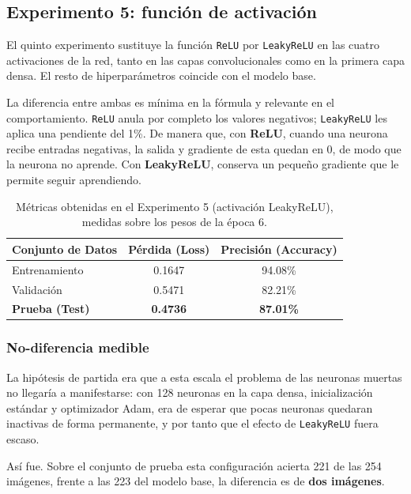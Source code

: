 \documentclass[11pt, a4paper]{article}
\begin{document}
\subsection{Experimento 5: función de activación}

El quinto experimento sustituye la función \texttt{ReLU} por \texttt{LeakyReLU} en las cuatro activaciones de la red, tanto en las capas convolucionales como en la primera capa densa. El resto de hiperparámetros coincide con el modelo base.

La diferencia entre ambas es mínima en la fórmula y relevante en el comportamiento. \texttt{ReLU} anula por completo los valores negativos; \texttt{LeakyReLU} les aplica una pendiente del 1\%. De manera que, con \textbf{ReLU}, cuando una neurona recibe entradas negativas, la salida y gradiente de esta quedan en 0, de modo que la neurona no aprende. Con \textbf{LeakyReLU}, conserva un pequeño gradiente que le permite seguir aprendiendo.

\begin{table}[H]
\centering
\caption{Métricas obtenidas en el Experimento 5 (activación LeakyReLU), medidas sobre los pesos de la época 6.}
\label{tab:resultados_exp5}
\begin{tabular}{l c c}
\toprule
\textbf{Conjunto de Datos} & \textbf{Pérdida (Loss)} & \textbf{Precisión (Accuracy)} \\
\midrule
Entrenamiento & 0.1647 & 94.08\% \\
Validación & 0.5471 & 82.21\% \\
\textbf{Prueba (Test)} & \textbf{0.4736} & \textbf{87.01\%} \\
\bottomrule
\end{tabular}
\end{table}

\subsubsection{No-diferencia medible}

La hipótesis de partida era que a esta escala el problema de las neuronas muertas no llegaría a manifestarse: con 128 neuronas en la capa densa, inicialización estándar y optimizador Adam, era de esperar que pocas neuronas quedaran inactivas de forma permanente, y por tanto que el efecto de \texttt{LeakyReLU} fuera escaso.

Así fue. Sobre el conjunto de prueba esta configuración acierta 221 de las 254 imágenes, frente a las 223 del modelo base, la diferencia es de \textbf{dos imágenes}.
\end{document}
